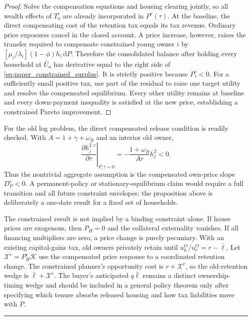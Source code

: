 \documentclass[11pt]{article}
\newcommand{\dd}{\mathrm d}
\newcommand{\1}{\mathbf 1}
\newcommand{\ellbar}{\bar\ell}
\begin{document}
\begin{proof}
Solve the compensation equations and housing clearing jointly, so all wealth
effects of $T_a^c$ are already incorporated in $P^c(\tau)$. At the baseline,
the direct compensating cost of the retention tax equals its tax revenue.
Ordinary price exposures cancel in the closed account. A price increase,
however, raises the transfer required to compensate constrained young owner
$i$ by
$[\mu_i/\lambda_i](1-\phi)h_i\,\dd P$. Therefore the consolidated balance
after holding every household at $\bar U_a$ has derivative equal to the right
side of \eqref{eq:paper_constrained_surplus}. It is strictly positive because
$P_\tau^c<0$. For a sufficiently small positive tax, use part of the residual
to raise one target utility and resolve the compensated equilibrium. Every
other utility remains at baseline and every down-payment inequality is
satisfied at the new price, establishing a constrained Pareto improvement.
\end{proof}

For the old log problem, the direct compensated release condition is readily
checked. With $A=1+\gamma+\omega_B$ and an interior old owner,
\begin{equation}
\left.\frac{\partial h_j^{2,c}}{\partial\tau}\right|_{P,\tau=0}
=-\frac{1+\omega_B}{Ar}h_j^2<0.
\end{equation}
Thus the nontrivial aggregate assumption is the compensated own-price slope
$D_P^c<0$. A permanent-policy or stationary-equilibrium claim would require a
full transition and all future constraint envelopes; the proposition above is
deliberately a one-date result for a fixed set of households.

The constrained result is not implied by a binding constraint alone. If house
prices are exogenous, then $P_H=0$ and the collateral externality vanishes. If
all financing multipliers are zero, a price change is purely pecuniary. With an
existing capital-gains tax, old owners privately retain until
$u_h^O/u_c^O=r-\ellbar$. Let
$\mathcal X^c=P_H^c\mathcal K$ use the compensated price response to a
coordinated retention change. The constrained planner's opportunity cost is
$r+\mathcal X^c$, so the old-retention wedge is
$\ellbar+\mathcal X^c$. The buyer's anticipated $q\ellbar$ remains a distinct
ownership-timing wedge and should be included in a general policy theorem only
after specifying which tenure absorbs released housing and how tax liabilities
move with $P$.

\vspace{0.6em}
\hrule
\end{document}

